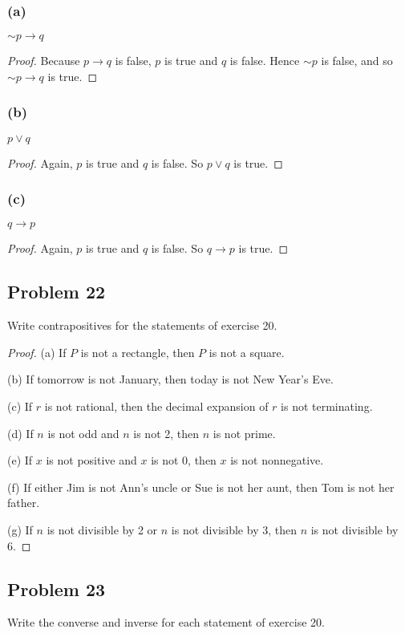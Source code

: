 \documentclass[14pt]{extarticle}
\begin{document}
\subsubsection{(a)}
${\sim p} \to q$

\begin{proof}
Because $p \to q$ is false, $p$ is true and $q$ is false. Hence ${\sim p}$ is
false, and so ${\sim p} \to q$ is true.
\end{proof}

\subsubsection{(b)}
$p \vee q$

\begin{proof}
Again, $p$ is true and $q$ is false. So $p \vee q$ is true.
\end{proof}

\subsubsection{(c)}
$q \to p$

\begin{proof}
Again, $p$ is true and $q$ is false. So $q \to p$ is true.
\end{proof}

\subsection{Problem 22}
Write contrapositives for the statements of exercise 20.

\begin{proof}
(a) If $P$ is not a rectangle, then $P$ is not a square.

(b) If tomorrow is not January, then today is not New Year’s Eve.

(c) If $r$ is not rational, then the decimal expansion of $r$ is not
terminating.

(d) If $n$ is not odd and $n$ is not 2, then $n$ is not prime.

(e) If $x$ is not positive and $x$ is not 0, then $x$ is not nonnegative.

(f) If either Jim is not Ann’s uncle or Sue is not her aunt, then Tom is not her
father.

(g) If $n$ is not divisible by 2 or $n$ is not divisible by 3, then $n$ is not
divisible by 6.
\end{proof}

\subsection{Problem 23}
Write the converse and inverse for each statement of exercise 20.
\end{document}
